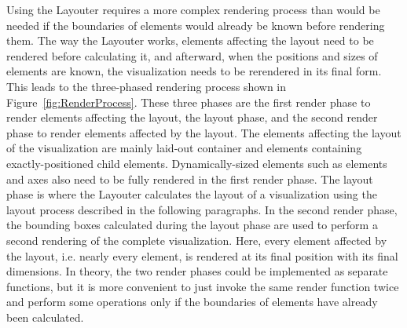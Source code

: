 Using the Layouter requires a more complex rendering process than
would be needed if the boundaries of elements would already be known
before rendering them. The way the Layouter works, elements affecting
the layout need to be rendered before calculating it, and afterward,
when the positions and sizes of elements are known, the visualization
needs to be rerendered in its final form. This leads to the
three-phased rendering process shown in
Figure~\ref{fig:RenderProcess}. These three phases are the first
render phase to render elements affecting the layout, the layout
phase, and the second render phase to render elements affected by the
layout. The elements affecting the layout of the visualization are
mainly laid-out container  and  elements
containing exactly-positioned child elements. Dynamically-sized
elements such as  elements and axes also need to be
fully rendered in the first render phase. The layout phase is where
the Layouter calculates the layout of a visualization using the
layout process described in the following paragraphs. In the second
render phase, the bounding boxes calculated during the layout phase
are used to perform a second rendering of the complete visualization.
Here, every element affected by the layout, i.e. nearly every element,
is rendered at its final position with its final dimensions. In
theory, the two render phases could be implemented as separate
functions, but it is more convenient to just invoke the same render
function twice and perform some operations only if the boundaries of
elements have already been calculated.


